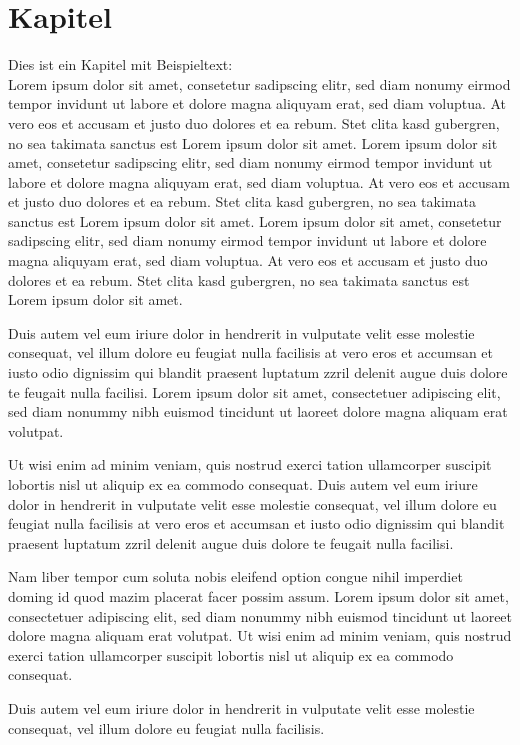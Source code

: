 \section{Kapitel}		   	
Dies ist ein Kapitel mit Beispieltext:\\
Lorem ipsum dolor sit amet, consetetur sadipscing elitr, sed diam nonumy eirmod tempor invidunt ut labore et dolore magna aliquyam erat, sed diam voluptua. At vero eos et accusam et justo duo dolores et ea rebum. Stet clita kasd gubergren, no sea takimata sanctus est Lorem ipsum dolor sit amet. Lorem ipsum dolor sit amet, consetetur sadipscing elitr, sed diam nonumy eirmod tempor invidunt ut labore et dolore magna aliquyam erat, sed diam voluptua. At vero eos et accusam et justo duo dolores et ea rebum. Stet clita kasd gubergren, no sea takimata sanctus est Lorem ipsum dolor sit amet. Lorem ipsum dolor sit amet, consetetur sadipscing elitr, sed diam nonumy eirmod tempor invidunt ut labore et dolore magna aliquyam erat, sed diam voluptua. At vero eos et accusam et justo duo dolores et ea rebum. Stet clita kasd gubergren, no sea takimata sanctus est Lorem ipsum dolor sit amet. 

Duis autem vel eum iriure dolor in hendrerit in vulputate velit esse molestie consequat, vel illum dolore eu feugiat nulla facilisis at vero eros et accumsan et iusto odio dignissim qui blandit praesent luptatum zzril delenit augue duis dolore te feugait nulla facilisi. Lorem ipsum dolor sit amet, consectetuer adipiscing elit, sed diam nonummy nibh euismod tincidunt ut laoreet dolore magna aliquam erat volutpat. 

Ut wisi enim ad minim veniam, quis nostrud exerci tation ullamcorper suscipit lobortis nisl ut aliquip ex ea commodo consequat. Duis autem vel eum iriure dolor in hendrerit in vulputate velit esse molestie consequat, vel illum dolore eu feugiat nulla facilisis at vero eros et accumsan et iusto odio dignissim qui blandit praesent luptatum zzril delenit augue duis dolore te feugait nulla facilisi. 

Nam liber tempor cum soluta nobis eleifend option congue nihil imperdiet doming id quod mazim placerat facer possim assum. Lorem ipsum dolor sit amet, consectetuer adipiscing elit, sed diam nonummy nibh euismod tincidunt ut laoreet dolore magna aliquam erat volutpat. Ut wisi enim ad minim veniam, quis nostrud exerci tation ullamcorper suscipit lobortis nisl ut aliquip ex ea commodo consequat. 

Duis autem vel eum iriure dolor in hendrerit in vulputate velit esse molestie consequat, vel illum dolore eu feugiat nulla facilisis. 

